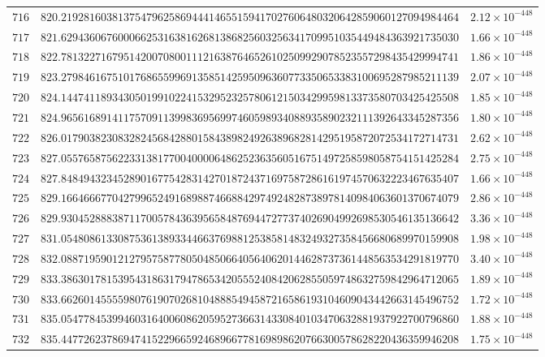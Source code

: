 \documentclass[12pt,reqno]{amsart}
\theoremstyle{remark}
\begin{document}
\begin{longtable}{clc}
$716$ & $820.2192816038137547962586944414655159417027606480320642859060127094984464$ & $2.12\times 10^{-448}$ \\
$717$ & $821.6294360676000662531638162681386825603256341709951035449484363921735030$ & $1.66\times 10^{-448}$ \\
$718$ & $822.7813227167951420070800111216387646526102509929078523557298435429994741$ & $1.86\times 10^{-448}$ \\
$719$ & $823.2798461675101768655996913585142595096360773350653383100695287985211139$ & $2.07\times 10^{-448}$ \\
$720$ & $824.1447411893430501991022415329523257806121503429959813373580703425425508$ & $1.85\times 10^{-448}$ \\
$721$ & $824.9656168914117570911399836956997460598934088935890232111392643345287356$ & $1.80\times 10^{-448}$ \\
$722$ & $826.0179038230832824568428801584389824926389682814295195872072534172714731$ & $2.62\times 10^{-448}$ \\
$723$ & $827.0557658756223313817700400006486252363560516751497258598058754151425284$ & $2.75\times 10^{-448}$ \\
$724$ & $827.8484943234528901677542831427018724371697587286161974570632223467635407$ & $1.66\times 10^{-448}$ \\
$725$ & $829.1664666770427996524916898874668842974924828738978140984063601370674079$ & $2.86\times 10^{-448}$ \\
$726$ & $829.9304528883871170057843639565848769447277374026904992698530546135136642$ & $3.36\times 10^{-448}$ \\
$727$ & $831.0548086133087536138933446637698812538581483249327358456680689970159908$ & $1.98\times 10^{-448}$ \\
$728$ & $832.0887195901212795758778050485066405640620144628737361448563534291819770$ & $3.40\times 10^{-448}$ \\
$729$ & $833.3863017815395431863179478653420555240842062855059748632759842964712065$ & $1.89\times 10^{-448}$ \\
$730$ & $833.6626014555598076190702681048885494587216586193104609043442663145496752$ & $1.72\times 10^{-448}$ \\
$731$ & $835.0547784539946031640060862059527366314330840103470632881937922700796860$ & $1.88\times 10^{-448}$ \\
$732$ & $835.4477262378694741522966592468966778169898620766300578628220436359946208$ & $1.75\times 10^{-448}$ \\

\end{longtable}
\end{document}
